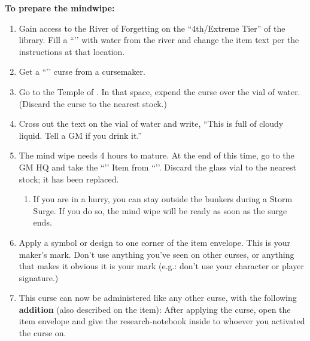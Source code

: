 \documentclass[green]{GL2020}
\begin{document}
\textbf{To prepare the mindwipe:}
\begin{enumerate}
  \item Gain access to the River of Forgetting on the “4th/Extreme Tier” of the library. Fill a ``\iGlassVial{}’’ with water from the river and change the item text per the instructions at that location.
  \item Get a ``\iWeakness{}’’ curse from a cursemaker.
  \item Go to the Temple of \pTechGod{}. In that space, expend the curse over the vial of water. (Discard the curse to the nearest stock.)
  \item Cross out the text on the vial of water and write,  “This is full of cloudy liquid. Tell a GM if you drink it.”
  \item The mind wipe needs 4 hours to mature. At the end of this time, go to the GM HQ and take the ``\iMindWipeCurse{}’’ Item from ``\sSignN’’. Discard the glass vial to the nearest stock; it has been replaced.
  \begin{enumerate}
    \item If you are in a hurry, you can stay outside the bunkers during a Storm Surge. If you do so, the mind wipe will be ready as soon as the surge ends.
  \end{enumerate}
  \item Apply a symbol or design to one corner of the item envelope. This is your maker’s mark. Don’t use anything you’ve seen on other curses, or anything that makes it obvious it is your mark (e.g.: don’t use your character or player signature.)
  \item This curse can now be administered like any other curse, with the following \textbf{addition} (also described on the item): After applying the curse, open the item envelope and give the research-notebook inside to whoever you activated the curse on.
\end{enumerate}
\end{document}
